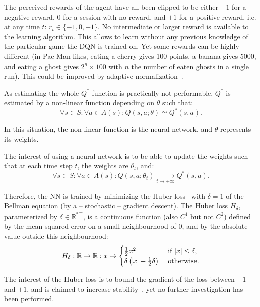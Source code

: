 \documentclass[letterpaper]{article}
\begin{document}
The perceived rewards of the agent have all been clipped to be either $-1$ for a negative reward, $0$ for a session with no reward, and $+1$
for a positive reward, i.e. at any time $t$: $r_t \in \{-1, 0, +1\}$. No intermediate or larger reward is available to the learning algorithm.
This allows to learn without any previous knowledge of the particular game the DQN is trained on. Yet some rewards can be highly different (in Pac-Man likes,
eating a cherry gives 100 points, a banana gives 5000, and eating a ghost gives $2^n \times 100$ with $n$ the number of eaten ghosts in a single run).
This could be improved by adaptive normalization~\citep{van2016learning}.

As estimating the whole $Q^*$ function is practically not performable, $Q^*$ is estimated by a non-linear function depending on $\theta$ such that:
\begin{equation}
	\forall s \in S : \forall a \in A(s) : Q(s, a; \theta) \simeq Q^*(s, a).
\end{equation}

In this situation, the non-linear function is the neural network, and $\theta$ represents its weights.

The interest of using a neural network is to be able to update the weights such that at each time step $t$, the weights are $\theta_t$, and:
\begin{equation}
	\forall s \in S : \forall a \in A(s) : Q(s, a; \theta_t) \xrightarrow[t \to +\infty]{} Q^*(s, a).
\end{equation}

Therefore, the NN is trained by minimizing the Huber loss~\citep{huber1964robust} with $\delta=1$ of the Bellman equation (by a -- stochastic -- gradient descent).
The Huber loss $H_\delta$, parameterized by $\delta \in {\mathbb R^*}^+$, is a continuous function (also $C^1$ but not $C^2$) defined by the mean
squared error on a small neighbourhood of $0$, and by the absolute value outside this neighbourhood:
\begin{equation}
	H_\delta : \mathbb R \to \mathbb R : x \mapsto \begin{cases}\frac 12x^2                                &\text{ if } \abs x \leq \delta,\\
	                                                            \delta\left(\abs x - \frac 12\delta\right) &\text{ otherwise.}\end{cases}
\end{equation}

The interest of the Huber loss is to bound the gradient of the loss between $-1$ and $+1$, and is claimed to increase stability~\citep{mnih2015human},
yet no further investigation has been performed.
\end{document}
